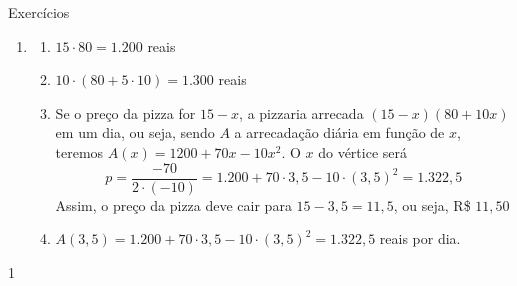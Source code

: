 \begin{answer}{Exercícios}
{\begin{enumerate}[wide]
Assim, o valor gasto com os apoios verticais será de $40\cdot500=20.000$ reais.

Obs.: Também é possível resolver o problema escolhendo o eixo x no topo da ponte. Assim, teríamos $V(30,−20)$, $(0,0)$ e $(60,0)$ como pontos conhecidos. Usando a forma $f(x)=a(x-x_1)(x-x_2)$ concluí-se ainda que os gastos com apoios verticais será R\$ $20.000{,}00$.


\item 
\begin{enumerate}[wide]
\item $15\cdot80=1.200$ reais
\item $10\cdot(80+5\cdot10)=1.300$ reais
\item Se o preço da pizza for $15-x$, a pizzaria arrecada $(15-x)(80+10x)$ em um dia, ou seja, sendo $A$ a arrecadação diária em função de $x$, teremos $A(x)=1200+70x−10x^2$. O $x$ do vértice será
\begin{equation*}
p=\frac{-70}{2\cdot(-10)}=1.200+70\cdot3{,}5-10\cdot(3{,}5)^2=1.322{,}5
\end{equation*}
Assim, o preço da pizza deve cair para $15-3{,}5=11{,}5$, ou seja, R\$ $11{,}50$

\item $A(3{,}5)=1.200+70\cdot3{,}5-10\cdot(3{,}5)^2=1.322{,}5$ reais por dia.
\end{enumerate}
\end{enumerate}
}{1}
\end{answer}

